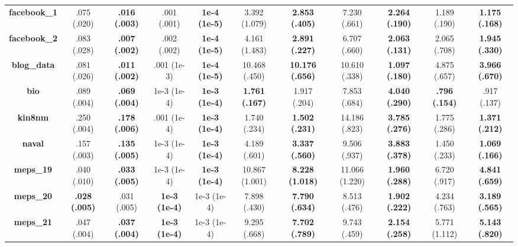 \documentclass{article}
\begin{document}
\begin{appendices}
\begin{table}[htbp]
{\begin{tabular}{ccccccccccc}
    \midrule
\textbf{facebook\_1} &           .075 (.020) &  \textbf{.016 (.003)} &           .001 (.001) &  \textbf{1e-4 (1e-5)} &          3.392 (1.079) &   \textbf{2.853 (.405)} &       7.230 (.661) &  \textbf{2.264 (.190)} &          1.189 (.190) &  \textbf{1.175 (.168)} \\
\textbf{facebook\_2} &           .083 (.028) &  \textbf{.007 (.002)} &           .002 (.002) &  \textbf{1e-4 (1e-5)} &          4.161 (1.483) &   \textbf{2.891 (.227)} &       6.707 (.660) &  \textbf{2.063 (.131)} &          2.065 (.708) &  \textbf{1.945 (.330)} \\
\textbf{blog\_data}  &           .081 (.026) &  \textbf{.011 (.002)} &           .001 (1e-3) &  \textbf{1e-4 (1e-5)} &          10.468 (.450) &  \textbf{10.176 (.656)} &      10.610 (.338) &  \textbf{1.097 (.180)} &          4.875 (.657) &  \textbf{3.966 (.670)} \\
\textbf{bio}        &           .089 (.004) &  \textbf{.069 (.004)} &           1e-3 (1e-4) &  \textbf{1e-3 (1e-4)} &  \textbf{1.761 (.167)} &            1.917 (.204) &       7.853 (.684) &  \textbf{4.040 (.290)} &  \textbf{.796 (.154)} &            .917 (.137) \\
\textbf{kin8nm}     &           .250 (.004) &  \textbf{.178 (.006)} &           .001 (1e-4) &  \textbf{1e-3 (1e-4)} &           1.740 (.234) &   \textbf{1.502 (.231)} &      14.186 (.823) &  \textbf{3.785 (.276)} &          1.775 (.286) &  \textbf{1.371 (.212)} \\
\textbf{naval}      &           .157 (.003) &  \textbf{.135 (.005)} &           1e-3 (1e-4) &  \textbf{1e-3 (1e-4)} &           4.189 (.601) &   \textbf{3.337 (.560)} &       9.506 (.937) &  \textbf{3.883 (.378)} &          1.450 (.233) &  \textbf{1.069 (.166)} \\
\textbf{meps\_19}    &           .040 (.010) &  \textbf{.033 (.005)} &           1e-3 (1e-4) &  \textbf{1e-3 (1e-4)} &         10.867 (1.001) &  \textbf{8.228 (1.018)} &     11.066 (1.220) &  \textbf{1.960 (.288)} &          6.720 (.917) &  \textbf{4.841 (.659)} \\
\textbf{meps\_20}    &  \textbf{.028 (.005)} &           .031 (.005) &  \textbf{1e-3 (1e-4)} &           1e-3 (1e-4) &           7.898 (.430) &   \textbf{7.790 (.634)} &       8.513 (.476) &  \textbf{1.902 (.222)} &          4.234 (.763) &  \textbf{3.189 (.565)} \\
\textbf{meps\_21}    &           .047 (.004) &  \textbf{.037 (.004)} &  \textbf{1e-3 (1e-4)} &           1e-3 (1e-4) &           9.295 (.668) &   \textbf{7.702 (.789)} &       9.743 (.459) &  \textbf{2.154 (.258)} &         5.771 (1.112) &  \textbf{5.143 (.820)} \\
    

\end{tabular}}
\end{table}
\end{appendices}
\end{document}

